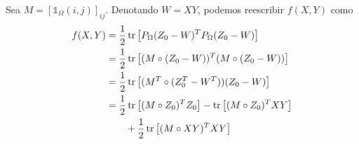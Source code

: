 Sea $M = \left[ \mathds{1}_{\Omega}(i, j) \right]_{ij}$. Denotando $W = XY$, podemos reescribir $f(X, Y)$ como
\begin{align}
    f(X, Y) &= \frac{1}{2} \operatorname{tr}\left[ P_{\Omega}(Z_0 - W)^T P_{\Omega}(Z_0 - W) \right] \nonumber \\
            &= \frac{1}{2} \operatorname{tr}\left[ (M \circ (Z_0 - W))^T (M\circ (Z_0 - W)) \right] \nonumber \\
            &= \frac{1}{2} \operatorname{tr}\left[ (M^T \circ (Z_0^T - W^T)) (Z_0 - W) \right] \nonumber \\
            &= \frac{1}{2} \operatorname{tr}\left[ (M \circ Z_0)^T Z_0 \right] - \operatorname{tr}\left[ (M\circ Z_0)^T XY \right]  \nonumber \\
            &\qquad + \frac{1}{2}\operatorname{tr}\left[ (M\circ XY)^T XY \right] \label{eqn:f}
\end{align}

